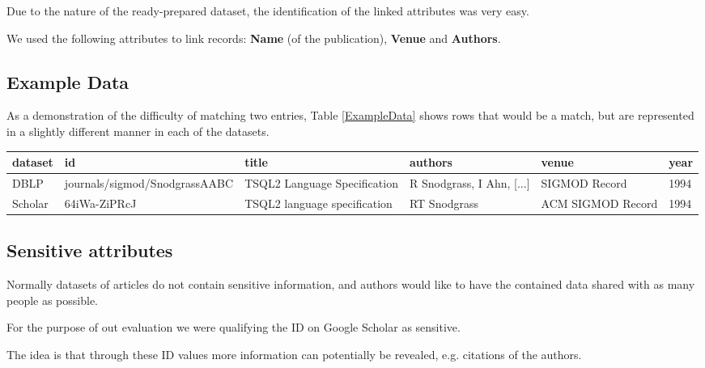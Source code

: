 \documentclass[sigconf,nonacm]{acmart}
\begin{document}
Due to the nature of the ready-prepared dataset, the identification of the
linked attributes was very easy.

We used the following attributes to link records:
\textbf{Name} (of the publication), \textbf{Venue} and \textbf{Authors}.

\subsection{Example Data}

As a demonstration of the difficulty of matching two entries, Table \ref{ExampleData} shows rows that would be a match, but are represented in a slightly different manner in each of the datasets.

\begin{table*}[t]
	\begin{tabular}{|l|l|l|l|l|l|}
	\hline
	dataset & id & title                        & authors                                                                                                                                                                              & venue             & year \\ \hline
	DBLP    &  journals/sigmod/SnodgrassAABC  & TSQL2 Language Specification & R Snodgrass, I Ahn, [...] & SIGMOD Record     & 1994 \\ \hline
	Scholar &   64iWa-ZiPRcJ & TSQL2 language specification & RT Snodgrass                                                                                                                                                                         & ACM SIGMOD Record & 1994 \\ \hline
	\end{tabular}
	\caption{Example Data Entries from DBLP and Scholar Dataset (id and authors column abbreviated)}
	\label{ExampleData}
\end{table*}

\subsection{Sensitive attributes}

Normally datasets of articles do not contain sensitive information,
and authors would like to have the contained data shared with
as many people as possible.

For the purpose of out evaluation we were qualifying the
ID on Google Scholar as sensitive.

The idea is that through these ID values more information
can potentially be revealed, e.g. citations of the authors.
\end{document}
